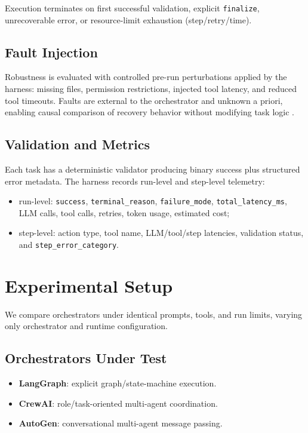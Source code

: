 Execution terminates on first successful validation, explicit \texttt{finalize}, unrecoverable error, or resource-limit exhaustion (step/retry/time).

\subsection{Fault Injection}

Robustness is evaluated with controlled pre-run perturbations applied by the harness: missing files, permission restrictions, injected tool latency, and reduced tool timeouts. Faults are external to the orchestrator and unknown a priori, enabling causal comparison of recovery behavior without modifying task logic \cite{basiri2016chaos}.

\subsection{Validation and Metrics}

Each task has a deterministic validator producing binary success plus structured error metadata. The harness records run-level and step-level telemetry:
\begin{itemize}
    \item run-level: \texttt{success}, \texttt{terminal\_reason}, \texttt{failure\_mode}, \texttt{total\_latency\_ms}, LLM calls, tool calls, retries, token usage, estimated cost;
    \item step-level: action type, tool name, LLM/tool/step latencies, validation status, and \texttt{step\_error\_category}.
\end{itemize}

\section{Experimental Setup}
\label{sec:experimental_setup}

We compare orchestrators under identical prompts, tools, and run limits, varying only orchestrator and runtime configuration.

\subsection{Orchestrators Under Test}
\label{sec:orchestrators}

\begin{itemize}
    \item \textbf{LangGraph}: explicit graph/state-machine execution.
    \item \textbf{CrewAI}: role/task-oriented multi-agent coordination.
    \item \textbf{AutoGen}: conversational multi-agent message passing.
\end{itemize}

